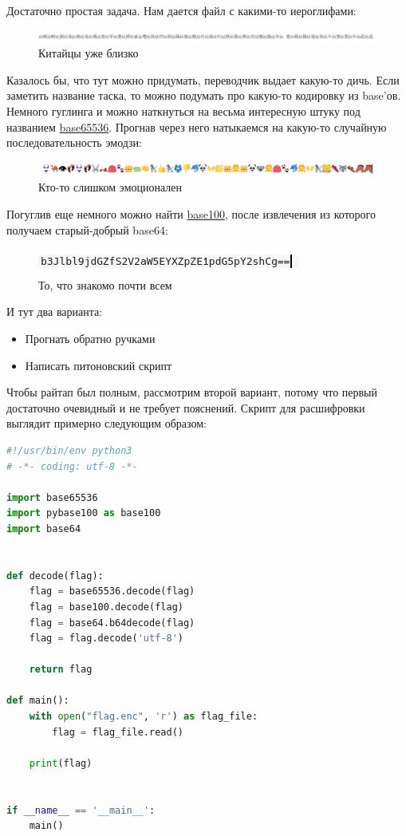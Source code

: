 \documentclass[idxtotoc,hyperref,openany,oneside]{files/crypto} %
\begin{document}
Достаточно простая задача. Нам дается файл с какими-то иероглифами:
\begin{figure}[H]
\begin{center}
\includegraphics[width=1.0\linewidth]{files/chinese}
\end{center}
\caption{Китайцы уже близко}
\label{fig:chinese}
\end{figure}
Казалось бы, что тут можно придумать, переводчик выдает какую-то дичь. Если заметить название таска, то можно подумать про какую-то кодировку из base'ов. Немного гуглинга и можно наткнуться на весьма интересную штуку под названием \href{https://github.com/qntm/base65536}{base65536}. Прогнав через него натыкаемся на какую-то случайную последовательность эмодзи:
\begin{figure}[H]
\begin{center}
\includegraphics[width=1.0\linewidth]{files/emoji}
\end{center}
\caption{Кто-то слишком эмоционален}
\label{fig:emoji}
\end{figure}
Погуглив еще немного можно найти \href{https://github.com/AdamNiederer/base100}{base100}, после извлечения из которого получаем старый-добрый base64:
\begin{figure}[H]
\begin{center}
\includegraphics[width=0.7\linewidth]{files/base64}
\end{center}
\caption{То, что знакомо почти всем}
\label{fig:base64}
\end{figure}
И тут два варианта:
\begin{itemize}
\item Прогнать обратно ручками
\item Написать питоновский скрипт
\end{itemize}
Чтобы райтап был полным, рассмотрим второй вариант, потому что первый достаточно очевидный и не требует пояснений. Скрипт для расшифровки выглядит примерно следующим образом:
\begin{lstlisting}[language=Python, caption=Дешифровка флага]
#!/usr/bin/env python3
# -*- coding: utf-8 -*-

import base65536
import pybase100 as base100
import base64


def decode(flag):
    flag = base65536.decode(flag)
    flag = base100.decode(flag)
    flag = base64.b64decode(flag)
    flag = flag.decode('utf-8')

    return flag

def main():
    with open("flag.enc", 'r') as flag_file:
        flag = flag_file.read()

    print(flag)


if __name__ == '__main__':
    main()
\end{lstlisting}
\end{document}
